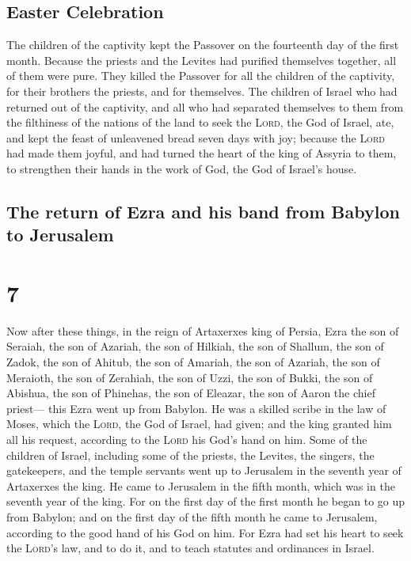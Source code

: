 \hypertarget{easter-celebration}{%
\subsection{Easter Celebration}\label{easter-celebration}}

 The children of the captivity kept the Passover on the
fourteenth day of the first month.  Because the priests
and the Levites had purified themselves together, all of them were pure.
They killed the Passover for all the children of the captivity, for
their brothers the priests, and for themselves.  The
children of Israel who had returned out of the captivity, and all who
had separated themselves to them from the filthiness of the nations of
the land to seek the \textsc{Lord}, the God of Israel, ate,
 and kept the feast of unleavened bread seven days with
joy; because the \textsc{Lord} had made them joyful, and had turned the
heart of the king of Assyria to them, to strengthen their hands in the
work of God, the God of Israel's house.

\hypertarget{the-return-of-ezra-and-his-band-from-babylon-to-jerusalem}{%
\subsection{The return of Ezra and his band from Babylon to
Jerusalem}\label{the-return-of-ezra-and-his-band-from-babylon-to-jerusalem}}

\hypertarget{section-6}{%
\section{7}\label{section-6}}

 Now after these things, in the reign of Artaxerxes king
of Persia, Ezra the son of Seraiah, the son of Azariah, the son of
Hilkiah,  the son of Shallum, the son of Zadok, the son of
Ahitub,  the son of Amariah, the son of Azariah, the son
of Meraioth,  the son of Zerahiah, the son of Uzzi, the
son of Bukki,  the son of Abishua, the son of Phinehas,
the son of Eleazar, the son of Aaron the chief priest--- 
this Ezra went up from Babylon. He was a skilled scribe in the law of
Moses, which the \textsc{Lord}, the God of Israel, had given; and the
king granted him all his request, according to the \textsc{Lord} his
God's hand on him.  Some of the children of Israel,
including some of the priests, the Levites, the singers, the
gatekeepers, and the temple servants went up to Jerusalem in the seventh
year of Artaxerxes the king.  He came to Jerusalem in the
fifth month, which was in the seventh year of the king. 
For on the first day of the first month he began to go up from Babylon;
and on the first day of the fifth month he came to Jerusalem, according
to the good hand of his God on him.  For Ezra had set his
heart to seek the \textsc{Lord}'s law, and to do it, and to teach
statutes and ordinances in Israel.

